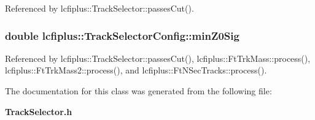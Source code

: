 Referenced by lcfiplus\-::\-Track\-Selector\-::passes\-Cut().

\subsubsection[{min\-Z0\-Sig}]{\setlength{\rightskip}{0pt plus 5cm}double lcfiplus\-::\-Track\-Selector\-Config\-::min\-Z0\-Sig}\label{classlcfiplus_1_1TrackSelectorConfig_a936f9c85d1c2ca111e8f5231f49f5bf8}


Referenced by lcfiplus\-::\-Track\-Selector\-::passes\-Cut(), lcfiplus\-::\-Ft\-Trk\-Mass\-::process(), lcfiplus\-::\-Ft\-Trk\-Mass2\-::process(), and lcfiplus\-::\-Ft\-N\-Sec\-Tracks\-::process().



The documentation for this class was generated from the following file\-:\begin{DoxyCompactItemize}
\item 
{\bf Track\-Selector.\-h}\end{DoxyCompactItemize}
